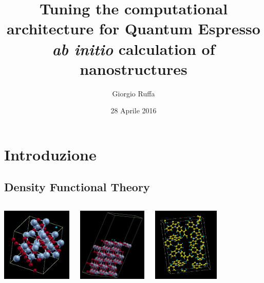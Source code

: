 \documentclass[8pt]{beamer}
\title[Tuning the computational architecture for Quantum Espresso \textit{ab initio} calculation of nanostructures] %
{Tuning the computational architecture for Quantum Espresso \textit{ab initio} calculation of nanostructures}
\author[Giorgio Ruffa] 
{Giorgio Ruffa}
\institute[Università degli Studi di Milano]{Università degli Studi di Milano}
\date{28 Aprile 2016}
\begin{document}
\begin{frame}
  \titlepage
\end{frame}

\section{Introduzione}
\subsection{Density Functional Theory}

\begin{frame}{}
\begin{columns}
		\begin{center}
			\includegraphics[height=3.5cm]{beam_co3.png}
		\end{center}
		\begin{center}
			\includegraphics[height=3.5cm]{titania_crystal.png}
		\end{center}
		\begin{center}
			\includegraphics[height=3.5cm]{beam_cbp.png}
		\end{center}
\end{columns}
\begin{columns}

\end{columns}
\end{frame}
\end{document}
